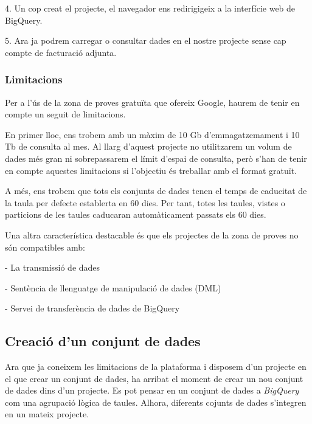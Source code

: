 \documentclass[12pt,longbibliography]{article}
\theoremstyle{definition}
\theoremstyle{remark}
\begin{document}
4. Un cop creat el projecte, el navegador ens redirigigeix a la interfície web de BigQuery.

\vspace{2mm}

5. Ara ja podrem carregar o consultar dades en el nostre projecte sense cap compte de facturació adjunta.

\subsubsection{Limitacions}

Per a l’ús de la zona de proves gratuïta que ofereix Google, haurem de tenir en compte un seguit de limitacions.

\vspace{2mm}

En primer lloc, ens trobem amb un màxim de 10 Gb d’emmagatzemament i 10 Tb de consulta al mes. Al llarg d’aquest projecte no utilitzarem un volum de dades més gran ni sobrepassarem el límit d’espai de consulta, però s’han de tenir en compte aquestes limitacions si l’objectiu és treballar amb el format gratuït.

\vspace{2mm}

A més, ens trobem que tots els conjunts de dades tenen el temps de caducitat de la taula per defecte establerta en 60 dies. Per tant, totes les taules, vistes o particions de les taules caducaran automàticament passats els 60 dies.

\vspace{2mm}

Una altra característica destacable és que els projectes de la zona de proves no són compatibles amb:

- La transmissió de dades

- Sentència de llenguatge de manipulació de dades (DML)

- Servei de transferència de dades de BigQuery

\subsection{Creació d'un conjunt de dades}

Ara que ja coneixem les limitacions de la plataforma i disposem d'un projecte en el que crear un conjunt de dades, ha arribat el moment de crear un nou conjunt de dades dins d'un projecte. Es pot pensar en un conjunt de dades a \textit{BigQuery} com una agrupació lògica de taules. Alhora, diferents cojunts de dades s'integren en un mateix projecte. 
\end{document}
